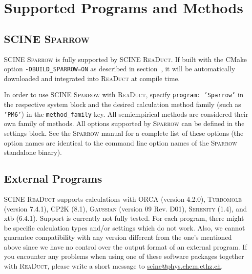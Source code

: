 \documentclass[]{tufte-book}
\begin{document}
\section{Supported Programs and Methods}

\subsection{SCINE \textsc{Sparrow}}

SCINE \textsc{Sparrow} is fully supported by SCINE \textsc{ReaDuct}. If built with the CMake option \texttt{-DBUILD\_SPARROW=ON}
as described in section~, it will be automatically downloaded and integrated into \textsc{ReaDuct}
at compile time.

In order to use SCINE \textsc{Sparrow} with \textsc{ReaDuct}, specify \texttt{program: 'Sparrow'} in the respective system
block and the desired calculation method family (such as \texttt{'PM6'}) in the \texttt{method\_family} key.
All semiempirical methods are considered their own family of methods.
All options supported by \textsc{Sparrow} can be defined in the settings block. See the \textsc{Sparrow} manual for a complete
list of these options (the option names are identical to the command line option names of the \textsc{Sparrow} standalone binary).

\subsection{External Programs}

SCINE \textsc{ReaDuct} supports calculations with \textsc{ORCA}\cite{orca} (version 4.2.0), \textsc{Turbomole}\cite{turbomole} (version 7.4.1), \textsc{CP2K} (8.1)\cite{cp2k}, \textsc{Gaussian}\cite{gaussian09} (version 09 Rev. D01), \textsc{Serenity}\cite{serenity} (1.4), and xtb (6.4.1)\cite{xtb}. Support is currently not fully tested. For each program, there might be specific calculation types and/or settings which do not work. Also, we cannot guarantee compatibility with any version different from the one's mentioned above since we have no control over the output format of an external program. If you encounter any problems when
using one of these software packages together with \textsc{ReaDuct}, please write a short message to \href{scine@phys.chem.ethz.ch}{scine@phys.chem.ethz.ch}.
\end{document}
